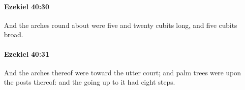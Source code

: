 		\paragraph{Ezekiel 40:30} %
			\label{EZEKIEL-40-30}

			And the arches round about were five and twenty cubits long, and five cubits broad.


		\paragraph{Ezekiel 40:31} %
			\label{EZEKIEL-40-31}

			And the arches thereof were toward the utter court; and palm trees were upon the posts thereof: and the going up to it had eight steps.


